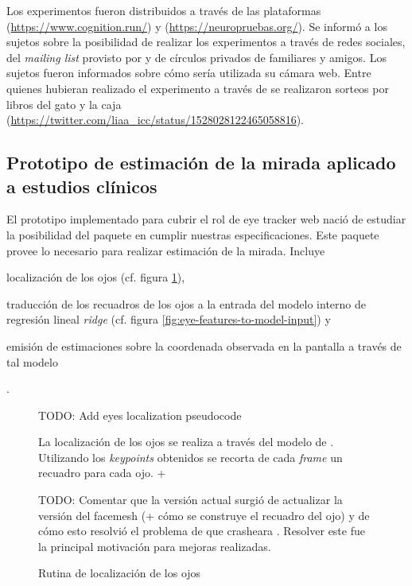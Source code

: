 Los experimentos fueron distribuidos a través de las plataformas \cognition
(\url{https://www.cognition.run/}) y \neuropruebas
(\url{https://neuropruebas.org/}).
Se informó a los sujetos sobre la posibilidad de realizar los experimentos a
través de redes sociales, del \textit{mailing list} provisto por \neuropruebas
y de círculos privados de familiares y amigos.
Los sujetos fueron informados sobre cómo sería utilizada su cámara web.
Entre quienes hubieran realizado el experimento a través de \neuropruebas se 
realizaron sorteos por libros del gato y la caja
(\url{https://twitter.com/liaa_icc/status/1528028122465058816}).

\subsection{Prototipo de estimación de la mirada aplicado a estudios clínicos}

El prototipo implementado para cubrir el rol de eye tracker web nació de
estudiar la posibilidad del paquete \webgazer en cumplir nuestras
especificaciones.
Este paquete provee lo necesario para realizar estimación de la mirada.
Incluye \begin{enumerate*}
  \item localización de los ojos (cf. figura \ref{fig:eyes-localization}),
  \item traducción de los recuadros de los ojos a la entrada del modelo interno
    de regresión lineal \textit{ridge} (cf. figura
    \ref{fig:eye-features-to-model-input}) y
  \item emisión de estimaciones sobre la coordenada observada en la pantalla a
    través de tal modelo
\end{enumerate*}.

\begin{figure}
  TODO: Add eyes localization pseudocode

La localización de los ojos se realiza a través del modelo de .
Utilizando los \textit{keypoints} obtenidos se recorta de cada \textit{frame}
un recuadro para cada ojo.
+


  TODO: Comentar que la versión actual surgió de actualizar la versión del
        facemesh (+ cómo se construye el recuadro del ojo) y de cómo esto
        resolvió el problema de que crasheara \webgazer.
        Resolver este \crash fue la principal motivación para mejoras
        realizadas.

  \caption{Rutina de localización de los ojos}
  \label{fig:eyes-localization}
\end{figure}

